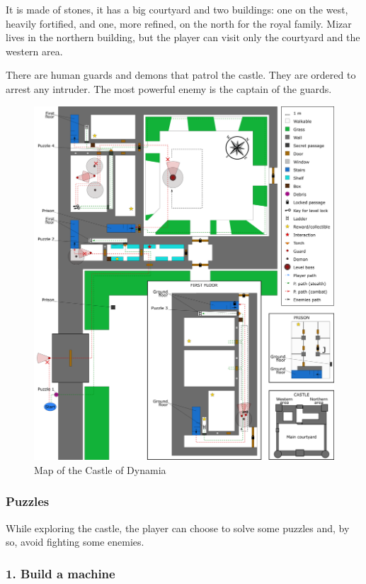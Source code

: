 It is made of stones, it has a big courtyard and two buildings: one on the west, heavily fortified, and one, more refined, on the north for the royal family. Mizar lives in the northern building, but the player can visit only the courtyard and the western area.

There are human guards and demons that patrol the castle. They are ordered to arrest any intruder. The most powerful enemy is the captain of the guards.

\begin{figure}[H]
  \centering
  \includegraphics[width=\textwidth]{Images/Maps/castleOfDynamia}
  \caption{Map of the Castle of Dynamia}
\end{figure}

\subsubsection{Puzzles}
While exploring the castle, the player can choose to solve some puzzles and, by so, avoid fighting some enemies.

\subsubsection*{1. Build a machine}

